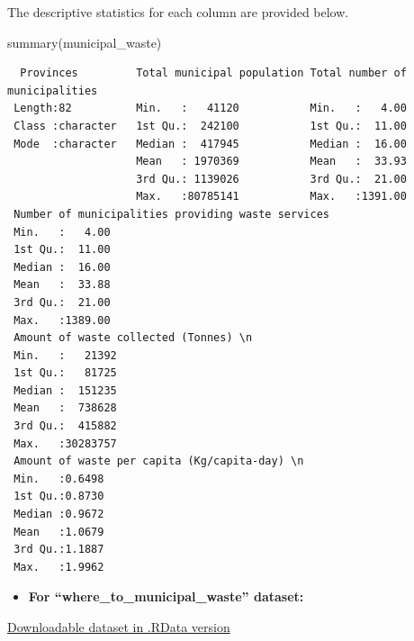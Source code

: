 \documentclass[
  11pt,
  a4paper,
  DIV=11,
  numbers=noendperiod]{scrartcl}
\newenvironment{Shaded}{\begin{snugshade}}{\end{snugshade}}
\newcommand{\FunctionTok}[1]{\textcolor[rgb]{0.28,0.35,0.67}{#1}}
\newcommand{\NormalTok}[1]{\textcolor[rgb]{0.00,0.23,0.31}{#1}}
\providecommand{\tightlist}{%
  \setlength{\itemsep}{0pt}\setlength{\parskip}{0pt}}\usepackage{longtable,booktabs,array}
\begin{document}
The descriptive statistics for each column are provided below.

\begin{Shaded}
\begin{Highlighting}[]
\FunctionTok{summary}\NormalTok{(municipal\_waste)}
\end{Highlighting}
\end{Shaded}

\begin{verbatim}
  Provinces         Total municipal population Total number of municipalities
 Length:82          Min.   :   41120           Min.   :   4.00               
 Class :character   1st Qu.:  242100           1st Qu.:  11.00               
 Mode  :character   Median :  417945           Median :  16.00               
                    Mean   : 1970369           Mean   :  33.93               
                    3rd Qu.: 1139026           3rd Qu.:  21.00               
                    Max.   :80785141           Max.   :1391.00               
 Number of municipalities providing waste services
 Min.   :   4.00                                  
 1st Qu.:  11.00                                  
 Median :  16.00                                  
 Mean   :  33.88                                  
 3rd Qu.:  21.00                                  
 Max.   :1389.00                                  
 Amount of waste collected (Tonnes) \n
 Min.   :   21392                     
 1st Qu.:   81725                     
 Median :  151235                     
 Mean   :  738628                     
 3rd Qu.:  415882                     
 Max.   :30283757                     
 Amount of waste per capita (Kg/capita-day) \n
 Min.   :0.6498                               
 1st Qu.:0.8730                               
 Median :0.9672                               
 Mean   :1.0679                               
 3rd Qu.:1.1887                               
 Max.   :1.9962                               
\end{verbatim}

\begin{itemize}
\tightlist
\item
  \textbf{For ``where\_to\_municipal\_waste'' dataset:}
\end{itemize}

\href{https://github.com/emu-hacettepe-analytics/emu660-spring2024-Dilara-pro/tree/main/project/data}{Downloadable
dataset in .RData version}
\end{document}

